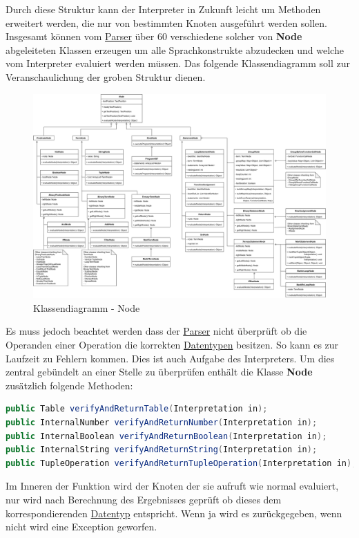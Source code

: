 Durch diese Struktur kann der Interpreter in Zukunft leicht um Methoden erweitert werden, die nur von bestimmten Knoten ausgeführt werden sollen. 
Insgesamt können vom \underline{Parser} über 60 verschiedene solcher von \textbf{Node} abgeleiteten Klassen erzeugen um alle Sprachkonstrukte abzudecken und welche vom Interpreter evaluiert werden müssen. Das folgende Klassendiagramm soll zur Veranschaulichung der groben Struktur dienen. 
\begin{figure}[H]
\centering
	\includegraphics[width=1.1\textwidth]{images/NodeClassDiagram-1.png}\par\vspace{0.5cm}
	\caption{Klassendiagramm - Node}
\end{figure}

Es muss jedoch beachtet werden dass der \underline{Parser} nicht überprüft ob die Operanden einer Operation die korrekten \underline{Datentypen} besitzen. So kann es zur Laufzeit zu Fehlern kommen. Dies ist auch Aufgabe des Interpreters. Um dies zentral gebündelt an einer Stelle zu überprüfen enthält die Klasse \textbf{Node} zusätzlich folgende Methoden:

\begin{lstlisting}[caption=Methoden zur Typüberprüfung,label={lst:verifyMethods}, language=Java]
public Table verifyAndReturnTable(Interpretation in);
public InternalNumber verifyAndReturnNumber(Interpretation in);
public InternalBoolean verifyAndReturnBoolean(Interpretation in);
public InternalString verifyAndReturnString(Interpretation in);
public TupleOperation verifyAndReturnTupleOperation(Interpretation in);
\end{lstlisting}
Im Inneren der Funktion wird der Knoten der sie aufruft wie normal evaluiert, nur wird nach Berechnung des Ergebnisses geprüft ob dieses dem korrespondierenden \underline{Datentyp} entspricht. Wenn ja wird es zurückgegeben, wenn nicht wird eine Exception geworfen.

